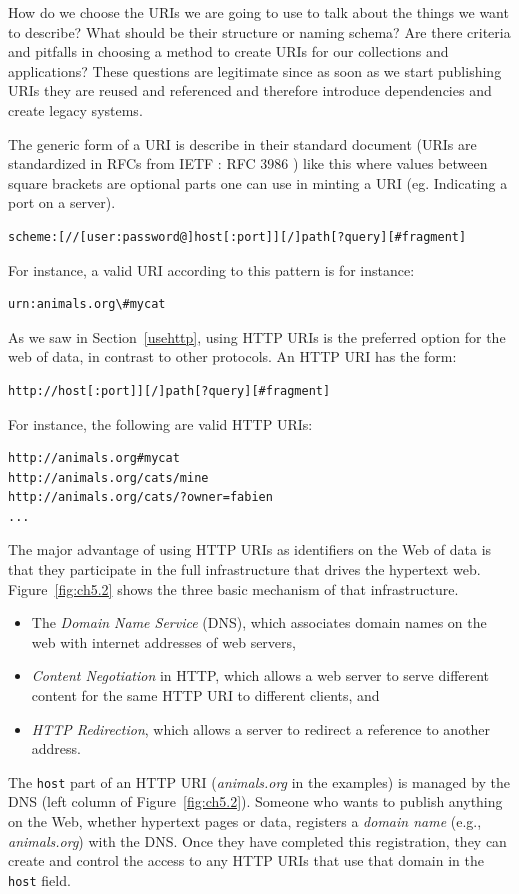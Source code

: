 How do we choose the URIs we are going to use to talk about the things
we want to describe? What should be their structure or naming schema?
Are there criteria and pitfalls in choosing a method to create URIs for
our collections and applications? These questions are legitimate since
as soon as we start publishing URIs they are reused and referenced and
therefore introduce dependencies and create legacy systems.

The generic form of a URI is describe in their standard
document (URIs are standardized in RFCs from IETF : RFC 3986
  \cite{masinter2005uniform}) like this where values between
square brackets are optional parts one can use in minting a URI (eg.
Indicating a port on a server).

\begin{lstlisting}
scheme:[//[user:password@]host[:port]][/]path[?query][#fragment]
\end{lstlisting}

For instance, a valid URI according to this pattern is for instance:

\begin{lstlisting}
urn:animals.org\#mycat
\end{lstlisting}

As we saw in Section~\ref{usehttp}, using HTTP URIs is the preferred option for the web 
of data, in contrast to other protocols.  An HTTP URI has the form: 


\begin{lstlisting}
http://host[:port]][/]path[?query][#fragment]
\end{lstlisting}


For instance, the following are valid HTTP URIs:

\begin{lstlisting}
http://animals.org#mycat
http://animals.org/cats/mine
http://animals.org/cats/?owner=fabien
...
\end{lstlisting}

The major advantage of using HTTP URIs as identifiers on the  Web  of data is that
they participate in the full infrastructure that drives the hypertext web.  Figure~\ref{fig:ch5.2} shows the three basic mechanism of that infrastructure. 
\begin{itemize}
    \item The \emph{Domain Name Service} (DNS), which associates domain names on the web with internet addresses of web servers,
    \item \emph{Content Negotiation} in HTTP, which allows a web 
     server to serve different content for the same HTTP URI to different
     clients, and
     \item \emph{HTTP Redirection}, which allows a server to redirect a reference
     to another address.
\end{itemize}
The \texttt{host} part of an HTTP URI (\emph{animals.org} in the examples) is managed by 
the DNS (left column of Figure~\ref{fig:ch5.2}).   Someone who wants to publish 
anything on the Web, whether hypertext pages or data, registers a \emph{domain 
name} (e.g., \emph{animals.org}) with the DNS.  Once they have completed this registration, they 
can create and control the access to
any HTTP URIs  that use that domain in the \texttt{host} field. 


